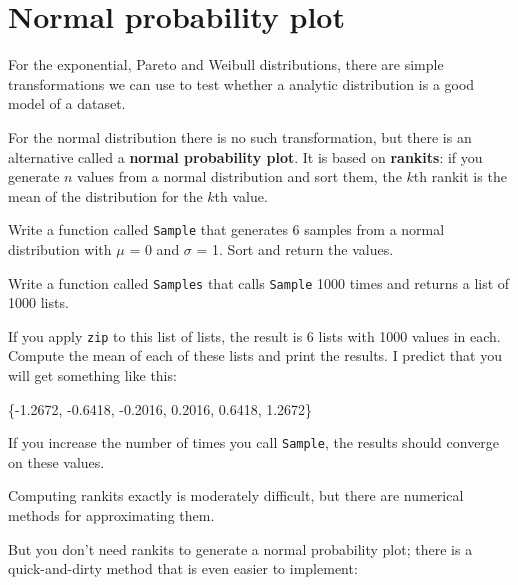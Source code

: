 \documentclass[12pt]{book}
\begin{document}
\section{Normal probability plot}

For the exponential, Pareto and Weibull distributions, there are
simple transformations we can use to test whether a analytic
distribution is a good model of a dataset.

For the normal distribution there is no such transformation, but there
is an alternative called a {\bf normal probability plot}.  It is based
on {\bf rankits}: if you generate $n$ values from a normal
distribution and sort them, the $k$th rankit is the mean of the
distribution for the $k$th value.

\begin{exercise}
Write a function called {\tt Sample} that generates 6 samples from a
normal distribution with $\mu$ = 0 and $\sigma$ = 1.  Sort and return
the values.

Write a function called {\tt Samples} that calls {\tt Sample} 1000
times and returns a list of 1000 lists.

If you apply {\tt zip} to this list of lists, the result is 6 lists
with 1000 values in each.  Compute the mean of each of these lists
and print the results.  I predict that you will get something like
this:

\{-1.2672,   -0.6418,   -0.2016,   0.2016,   0.6418,   1.2672\}

If you increase the number of times you call {\tt Sample}, the
results should converge on these values.

\end{exercise}


Computing rankits exactly is moderately difficult, but there are
numerical methods for approximating them.

But you don't need rankits to generate a normal probability plot;
there is a quick-and-dirty method that is even easier to implement:
\end{document}
